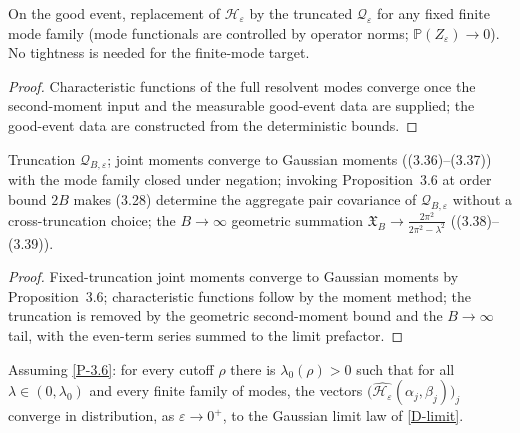 \begin{lemma}\label{P-red}
  \leanok
  On the good event, replacement of \(\mathcal{H}_\varepsilon\) by the
  truncated \(\mathcal{Q}_\varepsilon\) for any fixed finite mode family
  (mode functionals are controlled by operator norms;
  \(\mathbb{P}(Z_\varepsilon) \to 0\)). No tightness is needed for the
  finite-mode target.
\end{lemma}
\begin{proof}\leanok
  Characteristic functions of the full resolvent modes converge once the
  second-moment input and the measurable good-event data are supplied;
  the good-event data are constructed from the deterministic bounds.
\end{proof}

\begin{lemma}\label{P-mom}
  \leanok
  Truncation \(\mathcal{Q}_{B,\varepsilon}\); joint moments converge to
  Gaussian moments ((3.36)--(3.37)) with the mode family closed under
  negation; invoking Proposition~3.6 at order bound \(2B\) makes (3.28)
  determine the aggregate pair covariance of
  \(\mathcal Q_{B,\varepsilon}\) without a cross-truncation choice; the
  \(B \to \infty\) geometric summation \(\mathfrak{X}_B \to
  \frac{2\pi^2}{2\pi^2-\lambda^2}\) ((3.38)--(3.39)).
\end{lemma}
\begin{proof}\leanok
  Fixed-truncation joint moments converge to Gaussian moments by
  Proposition~3.6; characteristic functions follow by the moment method;
  the truncation is removed by the geometric second-moment bound and the
  \(B \to \infty\) tail, with the even-term series summed to the limit
  prefactor.
\end{proof}

\begin{theorem}\label{T-1.1}
  \leanok
  Assuming \ref{P-3.6}: for every cutoff \(\rho\) there is
  \(\lambda_0(\rho) > 0\) such that for all \(\lambda \in (0,\lambda_0)\)
  and every finite family of modes, the vectors
  \(\big(\widehat{\mathcal{H}_\varepsilon}(\alpha_j,\beta_j)\big)_j\)
  converge in distribution, as \(\varepsilon \to 0^+\), to the Gaussian
  limit law of \ref{D-limit}.
\end{theorem}
